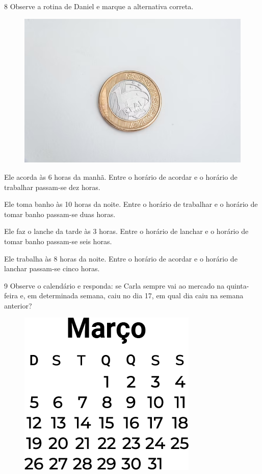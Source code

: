 \pagebreak
\num{8} Observe a rotina de Daniel e marque a alternativa correta.

\begin{figure}[htpb!]
\centering
\includegraphics[width=.8\textwidth]{./media/image118.png}
\end{figure}

\begin{escolha}
\item Ele acorda às 6 horas da manhã. Entre o horário de acordar e o horário de trabalhar passam-se dez horas.

\item Ele toma banho às 10 horas da noite. Entre o horário de trabalhar e o horário de tomar banho passam-se duas horas.

\item Ele faz o lanche da tarde às 3 horas. Entre o horário de lanchar e o horário de tomar banho passam-se seis horas.

\item Ele trabalha às 8 horas da noite. Entre o horário de acordar e o horário de lanchar passam-se cinco horas.
\end{escolha}


\pagebreak
\num{9} Observe o calendário e responda: se Carla sempre vai ao mercado na
quinta-feira e, em determinada semana, caiu no dia 17, em qual dia caiu na semana anterior?

\begin{figure}[htpb!]
\centering
\includegraphics[width=.5\textwidth]{./media/image119.png}
\end{figure}

